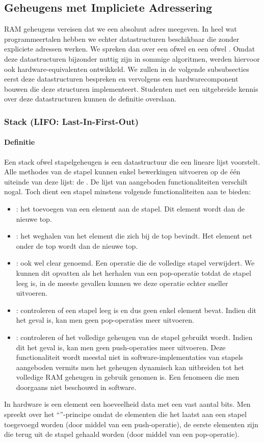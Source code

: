 \subsection{Geheugens met Impliciete Adressering}
RAM geheugens vereisen dat we een absoluut adres meegeven. In heel wat programmeertalen hebben we echter datastructuren beschikbaar die zonder expliciete adressen werken. We spreken dan over een  ofwel  en een  ofwel . Omdat deze datastructuren bijzonder nuttig zijn in sommige algoritmen, werden hiervoor ook hardware-equivalenten ontwikkeld. We zullen in de volgende subsubsecties eerst deze datastructuren bespreken en vervolgens een hardwarecomponent bouwen die deze structuren implementeert. Studenten met een uitgebreide kennis over deze datastructuren kunnen de definitie overslaan.
\subsubsection{Stack (LIFO: Last-In-First-Out)}
\paragraph{Definitie}Een stack ofwel stapelgeheugen is een datastructuur die een lineare lijst voorstelt. Alle methodes van de stapel kunnen enkel bewerkingen uitvoeren op de \'e\'en uiteinde van deze lijst: de . De lijst van aangeboden functionaliteiten verschilt nogal. Toch dient een stapel minstens volgende functionaliteiten aan te bieden:
\begin{itemize}
 \item {}: het toevoegen van een element aan de stapel. Dit element wordt dan de nieuwe top.
 \item {}: het weghalen van het element die zich bij de top bevindt. Het element net onder de top wordt dan de nieuwe top.
 \item {}: ook wel clear genoemd. Een operatie die de volledige stapel verwijdert. We kunnen dit opvatten als het herhalen van een pop-operatie totdat de stapel leeg is, in de meeste gevallen kunnen we deze operatie echter sneller uitvoeren.
 \item {}: controleren of een stapel leeg is en dus geen enkel element bevat. Indien dit het geval is, kan men geen pop-operaties meer uitvoeren.
 \item {}: controleren of het volledige geheugen van de stapel gebruikt wordt. Indien dit het geval is, kan men geen push-operaties meer uitvoeren. Deze functionaliteit wordt meestal niet in software-implementaties van stapels aangeboden vermits men het geheugen dynamisch kan uitbreiden tot het volledige RAM geheugen in gebruik genomen is. Een fenomeen die men doorgaans niet beschouwd in software.
\end{itemize}
In hardware is een element een hoeveelheid data met een vast aantal bits. Men spreekt over het ``''-principe omdat de elementen die het laatst aan een stapel toegevoegd worden (door middel van een push-operatie), de eerste elementen zijn die terug uit de stapel gehaald worden (door middel van een pop-operatie).

